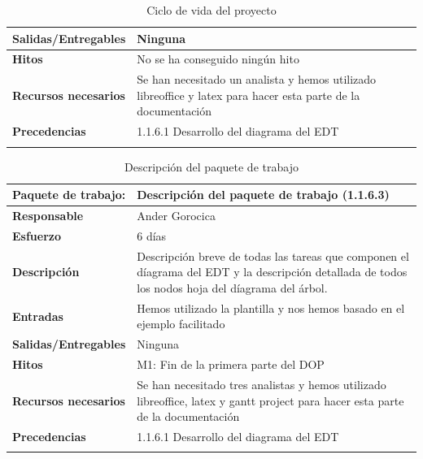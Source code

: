\documentclass{report}
\begin{document}
\begin{center}
\begin{longtable}{|p{6cm}|p{6cm}|}
                    \hline
                    \textbf{Salidas/Entregables} & Ninguna\\
                    \hline
                    \textbf{Hitos} & No se ha conseguido ningún hito\\
                    \hline
                    \textbf{Recursos necesarios} & Se han necesitado un analista y hemos utilizado libreoffice y latex para hacer esta parte de la documentación\\
                    \hline
                    \textbf{Precedencias} & 1.1.6.1 Desarrollo del diagrama del EDT\\
                    \hline
                    \caption{Ciclo de vida del proyecto}
                \end{longtable}
                \begin{longtable}{|p{6cm}|p{6cm}|}
                    \hline
                    \textbf{Paquete de trabajo:} & Descripción del paquete de trabajo (1.1.6.3)\\
                    \hline
                    \textbf{Responsable} & Ander Gorocica\\
                    \hline
                    \textbf{Esfuerzo} & 6 días\\
                    \hline
                    \textbf{Descripción} & Descripción breve de todas las tareas que componen el díagrama del EDT y la descripción detallada de todos los nodos hoja del díagrama del árbol.\\
                    \hline
                    \textbf{Entradas} & Hemos utilizado la plantilla y nos hemos basado en el ejemplo facilitado\\
                    \hline
                    \textbf{Salidas/Entregables} & Ninguna\\
                    \hline
                    \textbf{Hitos} & M1: Fin de la primera parte del DOP\\
                    \hline
                    \textbf{Recursos necesarios} & Se han necesitado tres analistas y hemos utilizado libreoffice, latex y gantt project para hacer esta parte de la documentación\\
                    \hline
                    \textbf{Precedencias} & 1.1.6.1 Desarrollo del diagrama del EDT\\
                    \hline
                    \caption{Descripción del paquete de trabajo}
                \end{longtable}
                \clearpage

\end{center}
\end{document}
